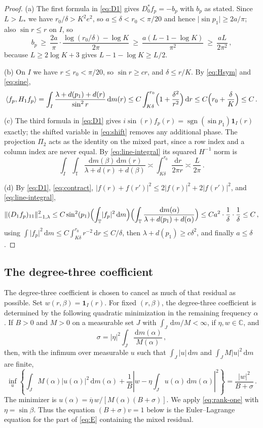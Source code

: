 \documentclass[11pt]{amsart}
\theoremstyle{plain}
\theoremstyle{definition}
\newcommand{\T}{\mathbb T}
\newcommand{\1}{\mathbf 1}
\newcommand{\ip}[2]{\langle #1,#2\rangle}
\newcommand{\norm}[1]{\lVert #1\rVert}
\newcommand{\abs}[1]{\lvert #1\rvert}
\newcommand{\dd}{\,\mathrm d}
\newcommand{\sgn}{\operatorname{sgn}}
\newcommand{\Hminus}[1]{\norm{#1}_{-1,\lambda}}
\begin{document}
\begin{proof}
(a) The first formula in \eqref{eq:D1} gives $D_0^*f_p=-b_p$ with $b_p$ as
stated.  Since $L>L_*$ we have $r_0/\delta>K^2e^2$, so $a\leq\delta<r_0<\pi/20$
and hence $\abs{\sin p_1}\geq2a/\pi$; also $\sin r\leq r$ on $I$, so
\[
  b_p\ \geq\ \frac{2a}\pi\cdot\frac{\log(r_0/\delta)-\log K}{2\pi}
  \ \geq\ \frac{a(L-1-\log K)}{\pi^2}\ \geq\ \frac{aL}{2\pi^2}\, ,
\]
because $L\geq2\log K+3$ gives $L-1-\log K\geq L/2$.

(b) On $I$ we have $r\leq r_0<\pi/20$, so $\sin r\geq cr$, and $\delta\leq r/K$.
By \eqref{eq:Hsym} and \eqref{eq:sine},
\[
  \ip{f_p}{H_1f_p}=\int_I\frac{\lambda+d(p_1)+d(r)}{\sin^2r}\dd m(r)
  \leq C\int_{K\delta}^{r_0}\Bigl(1+\frac{\delta^2}{r^2}\Bigr)\dd r
  \leq C\Bigl(r_0+\frac\delta K\Bigr)\leq C\, .
\]

(c) The third formula in \eqref{eq:D1} gives
$i\sin(r)f_p(r)=\sgn(\sin p_1)\1_I(r)$ exactly; the shifted variable in
 \eqref{eq:shift} removes any additional phase.  The projection $\Pi_2$ acts
as the identity on the mixed part, since a row index and a column index are
never equal.  By \eqref{eq:line-integral} its squared $H^{-1}$ norm is
\[
  \int_I\int_\T\frac{\dd m(\beta)\dd m(r)}{\lambda+d(r)+d(\beta)}
  \asymp\int_{K\delta}^{r_0}\frac{\dd r}{2\pi r}\asymp\frac L{2\pi}\, .
\]

(d) By \eqref{eq:D1}, \eqref{eq:contract},
$\abs{f(r)+f(r')}^2\leq2\abs{f(r)}^2+2\abs{f(r')}^2$, and
\eqref{eq:line-integral},
\[
  \Hminus{(D_1f_p)_{11}}^2
  \leq C\sin^2 (p_1)\Bigl(\int_\T\abs{f_p}^2\dd m\Bigr)
   \Bigl(\int_\T\frac{\dd m(\alpha)}{\lambda+d(p_1)+d(\alpha)}\Bigr)
  \leq C a^2\cdot\frac1\delta\cdot\frac1\delta\leq C\, ,
\]
using $\int\abs{f_p}^2\dd m\leq C\int_{K\delta}^{r_0}r^{-2}\dd r\leq C/\delta$,
then $\lambda+d(p_1)\geq c\delta^2$, and finally $a\leq\delta$.
\end{proof}

\subsection{The degree-three coefficient}\label{sec:key}

The degree-three coefficient is chosen to cancel as much of that residual as
possible.  Set $w(r,\beta)=\1_I(r)$.  For fixed $(r,\beta)$, the degree-three
coefficient is determined by the following
quadratic minimization in the remaining frequency $\alpha$.  If $B>0$ and
$M>0$ on a measurable set $J$ with $\int_J\dd m/M<\infty$, if $\eta,w\in\mathbb C$, and
\[
  \sigma=\abs\eta^2\int_J\frac{\dd m(\alpha)}{M(\alpha)}\, ,
\]
then, with the infimum over measurable $u$ such that $\int_J\abs u\dd m$ and $\int_JM\abs u^2\dd m$ are finite,
\begin{equation}\label{eq:rank-one}
 \inf_u\left\{\int_JM(\alpha)\abs{u(\alpha)}^2\dd m(\alpha)
 +\frac1B\left|w-\eta\int_Ju(\alpha)\dd m(\alpha)\right|^2\right\}
 =\frac{\abs{w}^2}{B+\sigma}\, .
\end{equation}
The minimizer is
$u(\alpha)=\overline\eta\,w/[M(\alpha)(B+\sigma)]$.  We apply
\eqref{eq:rank-one} with $\eta=\sin\beta$.  Thus the equation
$(B+\sigma)v=1$ below is the Euler--Lagrange equation for the part of
\eqref{eq:E} containing the mixed residual.
\end{document}
